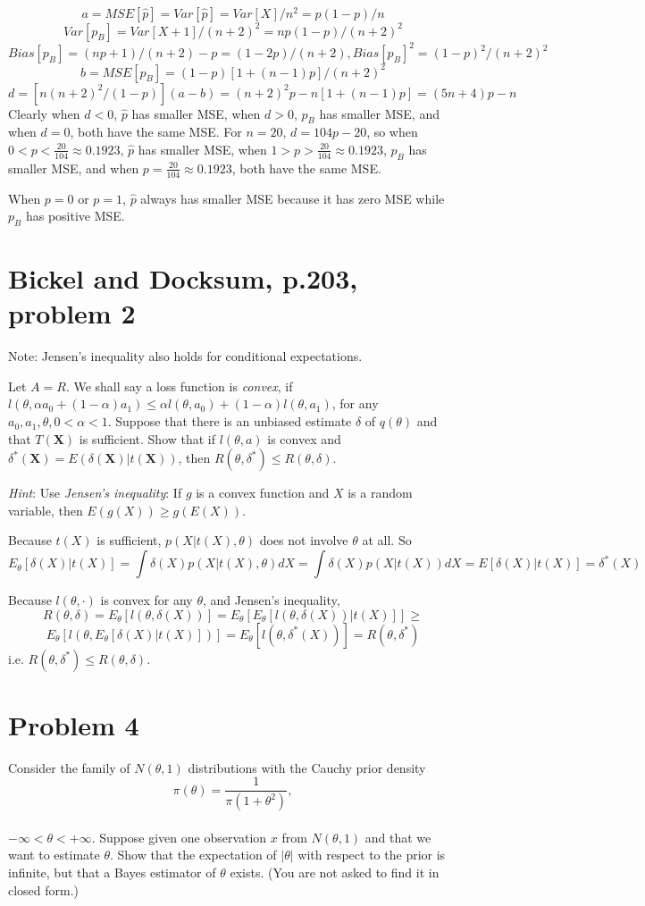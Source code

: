\documentclass[11pt]{article}
\newcommand{\ProbS}{\iftrue}
\newcommand{\ProbE}{\fi}
\begin{document}
$$
a = MSE[\hat{p}] = Var[\hat{p}] = Var[X] / n^2 = p(1-p)/n
$$
$$
Var[{p}_B] = Var[X+1] / (n+2)^2 = np(1-p)/(n+2)^2
$$
$$
Bias[{p}_B] = (np+1)/(n+2)-p
= (1-2p)/(n+2),
Bias[{p}_B]^2 = (1-p)^2/(n+2)^2
$$
$$
b = MSE[{p}_B] = (1-p)[1+(n-1)p]/(n+2)^2
$$
$$
d = [n(n+2)^2/(1-p)](a-b) = (n+2)^2 p - n[1+(n-1)p]
= (5n+4)p-n
$$
Clearly when $d<0$, $\hat{p}$ has smaller MSE,
when $d>0$, $p_B$ has smaller MSE,
and when $d=0$, both have the same MSE.
For $n=20$, $d=104p-20$, so
when $0<p<\frac{20}{104} \approx 0.1923$, $\hat{p}$ has smaller MSE,
when $1>p>\frac{20}{104} \approx 0.1923$, $p_B$ has smaller MSE,
and when $p=\frac{20}{104} \approx 0.1923$, both have the same MSE.

When $p=0$ or $p=1$, $\hat{p}$ always has smaller MSE because it has zero MSE while $p_B$ has positive MSE.

\section{Bickel and Docksum, p.203, problem 2}
\ProbS
Note: Jensen's inequality also holds for conditional expectations.

Let $A=R$. We shall say a loss function is \emph{convex}, if
$l(\theta, \alpha a_0 + (1-\alpha)a_1) \leq
\alpha l(\theta, a_0) + (1-\alpha)l(\theta, a_1)$,
for any $a_0, a_1, \theta, 0<\alpha<1$.
Suppose that there is an unbiased estimate $\delta$ of $q(\theta)$
and that $T(\mathbf{X})$ is sufficient.
Show that if $l(\theta, a)$ is convex and
$\delta^{*}(\mathbf{X}) = E(\delta(\mathbf{X}) | t(\mathbf{X}))$,
then $R(\theta, \delta^{*}) \leq R(\theta, \delta)$.

\emph{Hint}: Use \emph{Jensen's inequality}: If $g$ is a convex function and $X$ is a random variable, then $E(g(X)) \geq g(E(X))$.
\ProbE

Because $t(X)$ is sufficient, $p(X | t(X), \theta)$ does not involve $\theta$ at all. So
$$
E_{\theta}[\delta(X) | t(X)] =
\int \delta(X)p(X | t(X), \theta) dX =
\int \delta(X)p(X | t(X)) dX =
E[ \delta(X) | t(X) ] =
\delta^*(X)
$$

Because $l(\theta, \cdot)$ is convex for any $\theta$, and Jensen's inequality,
$$
R(\theta, \delta) =
E_\theta[l(\theta, \delta(X))] =
E_\theta[ E_\theta[l(\theta, \delta(X)) | t(X)] ] \geq
$$
$$
E_\theta[l(\theta, E_\theta[\delta(X) | t(X)])] =
E_\theta[l(\theta, \delta^*(X))] =
R(\theta, \delta^*)
$$
i.e. $R(\theta, \delta^*) \leq R(\theta, \delta)$.

\section{Problem 4}
\ProbS
Consider the family of $N(\theta, 1)$ distributions with the Cauchy prior density
$$
\pi(\theta) = \frac{1}{\pi(1+\theta^2)},
$$
\\
$-\infty < \theta < +\infty$.
Suppose given one observation $x$ from $N(\theta, 1)$
and that we want to estimate $\theta$.
Show that the expectation of $|\theta|$ with respect to the prior is infinite, but that a Bayes estimator of $\theta$ exists.
(You are not asked to find it in closed form.)
\ProbE
\end{document}

